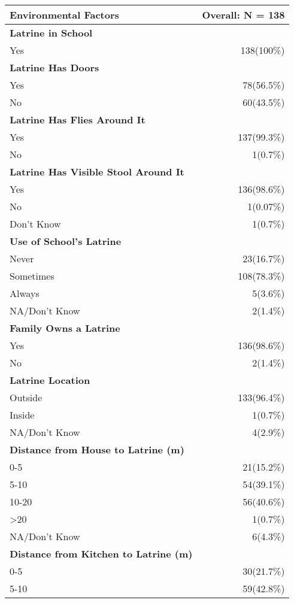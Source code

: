 \documentclass[4pt,letterpaper]{article}
\begin{document}
\begin{multicols}{2}
\begin{center}
\begin{tabular}{p{5cm}r}
\toprule
\textbf{Environmental Factors} & \textbf{Overall: N = 138} \\
\midrule
\textbf{Latrine in School} & \\
Yes & 138(100\%) \\
\midrule
\textbf{Latrine Has Doors} & \\
Yes & 78(56.5\%) \\
No & 60(43.5\%) \\
\midrule
\textbf{Latrine Has Flies Around It} & \\
Yes & 137(99.3\%) \\
No & 1(0.7\%) \\
\midrule
\textbf{Latrine Has Visible Stool Around It} & \\
Yes & 136(98.6\%) \\
No & 1(0.07\%) \\
Don't Know & 1(0.7\%) \\
\midrule
\textbf{Use of School's Latrine} & \\
Never & 23(16.7\%) \\
Sometimes & 108(78.3\%) \\
Always & 5(3.6\%) \\
NA/Don't Know & 2(1.4\%) \\
\midrule
\textbf{Family Owns a Latrine} & \\
Yes & 136(98.6\%) \\
No & 2(1.4\%) \\
\midrule
\textbf{Latrine Location} & \\
Outside & 133(96.4\%) \\
Inside & 1(0.7\%) \\
NA/Don't Know & 4(2.9\%) \\
\midrule
\textbf{Distance from House to Latrine (m)} & \\
0-5 & 21(15.2\%) \\
5-10 & 54(39.1\%) \\
10-20 & 56(40.6\%) \\
\textgreater 20 & 1(0.7\%) \\
NA/Don't Know & 6(4.3\%) \\
\midrule
\textbf{Distance from Kitchen to Latrine (m)} & \\
0-5 & 30(21.7\%) \\
5-10 & 59(42.8\%) \\

\end{tabular}
\end{center}
\end{multicols}
\end{document}
